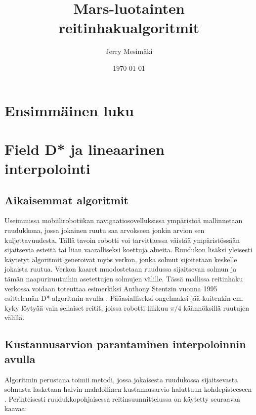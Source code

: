 \documentclass[finnish]{tktltiki2}
\title{Mars-luotainten reitinhakualgoritmit}
\author{Jerry Mesimäki}
\date{\today}
\theoremstyle{definition}
\theoremstyle{remark}
\begin{document}

\frontmatter      %

\maketitle        %
\makeabstract     %

\tableofcontents  %


\mainmatter       %

\section{Ensimmäinen luku}
\section{Field D* ja lineaarinen interpolointi}

\subsection{Aikaisemmat algoritmit}
Useimmissa mobiilirobotiikan navigaatiosovelluksissa ympäristöä mallinnetaan ruudukkona, jossa jokainen ruutu saa arvokseen jonkin arvion sen kuljettavuudesta. Tällä tavoin robotti voi tarvittaessa väistää ympäristössään sijaitsevia esteitä tai liian vaaralliseksi koettuja alueita. Ruudukon lisäksi yleisesti käytetyt algoritmit generoivat myös verkon, jonka solmut sijoitetaan keskelle jokaista ruutua. Verkon kaaret muodostetaan ruudussa sijaitsevan solmun ja tämän naapuriruutuihin asetettujen solmujen välille. Tässä mallissa reitinhaku verkossa voidaan toteuttaa esimerkiksi Anthony Stentzin vuonna 1995 esittelemän D*-algoritmin avulla \cite{stentz1995focussed}. Pääasialliseksi ongelmaksi jää kuitenkin em. kyky löytyää vain sellaiset reitit, joissa robotti liikkuu $\pi/4$ käännöksillä ruutujen välillä.

\subsection{Kustannusarvion parantaminen interpoloinnin avulla}
Algoritmin perustana toimii metodi, jossa jokaisesta ruudukossa sijaitsevasta solmusta lasketaan halvin mahdollinen kustannusarvio haluttuun kohdepisteeseen \cite{ferguson2007field}. Perinteisesti ruudukkopohjaisessa reitinsuunnittelussa on käytetty seuraavaa kaavaa:
\end{document}
